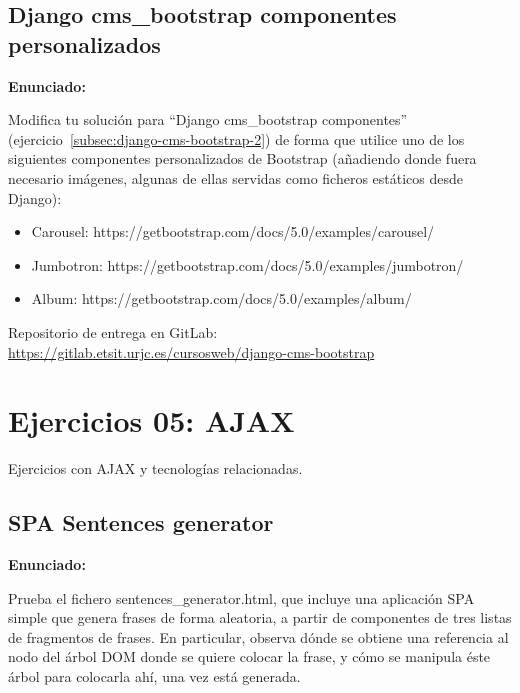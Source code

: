 \subsection{Django cms\_bootstrap componentes personalizados}
\label{subsec:django-cms-bootstrap-3}

\textbf{Enunciado:}

Modifica tu solución para ``Django cms\_bootstrap componentes'' (ejercicio~\ref{subsec:django-cms-bootstrap-2}) de forma que utilice uno de los siguientes componentes personalizados de Bootstrap (añadiendo donde fuera necesario imágenes, algunas de ellas servidas como ficheros estáticos desde Django):

\begin{itemize}
  \item Carousel: https://getbootstrap.com/docs/5.0/examples/carousel/
  \item Jumbotron: https://getbootstrap.com/docs/5.0/examples/jumbotron/
  \item Album: https://getbootstrap.com/docs/5.0/examples/album/
\end{itemize}


Repositorio de entrega en GitLab: \\
\url{https://gitlab.etsit.urjc.es/cursosweb/django-cms-bootstrap}


\section{Ejercicios 05: AJAX}

Ejercicios con AJAX y tecnologías relacionadas.

\subsection{SPA Sentences generator}
\label{subsec:spa-sentences-generator}

\textbf{Enunciado:}

Prueba el fichero sentences\_generator.html, que incluye una aplicación SPA simple que genera frases de forma aleatoria, a partir de componentes de tres listas de fragmentos de frases. En particular, observa dónde se obtiene una referencia al nodo del árbol DOM donde se quiere colocar la frase, y cómo se manipula éste árbol para colocarla ahí, una vez está generada.

